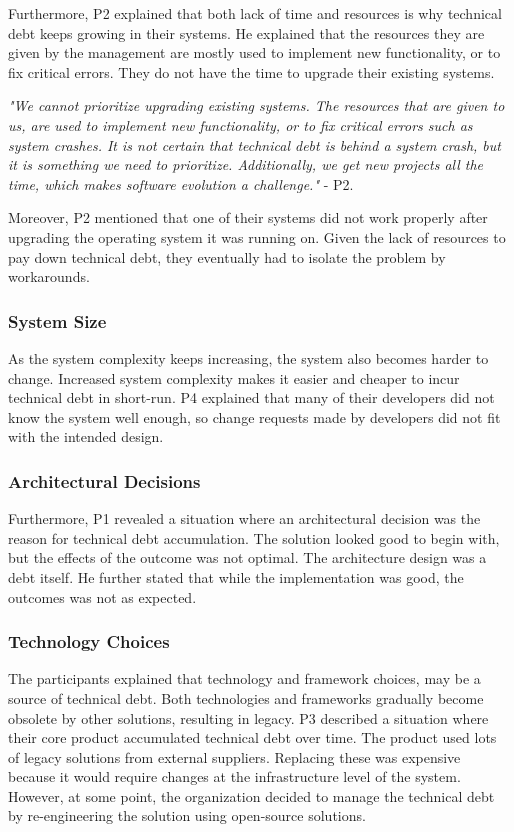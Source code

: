 Furthermore, P2 explained that both lack of time and resources is why technical debt keeps growing in their systems. He explained that the resources they are given by the management are mostly used to implement new functionality, or to fix critical errors. They do not have the time to upgrade their existing systems.
\begin{displayquote}
\textit{"We cannot prioritize upgrading existing systems. The resources that are given to us, are used to implement new functionality, or to fix critical errors such as system crashes. It is not certain that technical debt is behind a system crash, but it is something we need to prioritize. Additionally, we get new projects all the time, which makes software evolution a challenge."} - P2.
\end{displayquote} 
Moreover, P2 mentioned that one of their systems did not work properly after upgrading the operating system it was running on. Given the lack of resources to pay down technical debt, they eventually had to isolate the problem by workarounds. 

\subsubsection{System Size}
As the system complexity keeps increasing, the system also becomes harder to change. Increased system complexity makes it easier and cheaper to incur technical debt in short-run. P4 explained that many of their developers did not know the system well enough, so change requests made by developers did not fit with the intended design.

\subsubsection{Architectural Decisions}
Furthermore, P1 revealed a situation where an architectural decision was the reason for technical debt accumulation. The solution looked good to begin with, but the effects of the outcome was not optimal. The architecture design was a debt itself. He further stated that while the implementation was good, the outcomes was not as expected.

\subsubsection{Technology Choices}
The participants explained that technology and framework choices, may be a source of technical debt. Both technologies and frameworks gradually become obsolete by other solutions, resulting in legacy. P3 described a situation where their core product accumulated technical debt over time. The product used lots of legacy solutions from external suppliers. Replacing these was expensive because it would require changes at the infrastructure level of the system. However, at some point, the organization decided to manage the technical debt by re-engineering the solution using open-source solutions.




